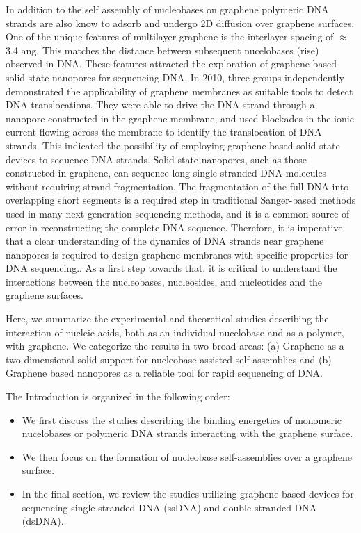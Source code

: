 In addition to the self assembly of nucleobases on graphene polymeric DNA strands are also know to adsorb and undergo 2D diffusion over graphene surfaces.\supercite{hampitak_protein_2020,wei_control_2019,he_planar_2020,shankla_step-defect_2019,shankla_conformational_2014,wells_assessing_2012} One of the unique features of multilayer graphene is the interlayer spacing of $\approx$ 3.4 ang. This matches the distance between subsequent nucelobases (rise) observed in DNA. These features attracted the exploration of graphene based solid state nanopores for sequencing DNA. In 2010, three groups independently demonstrated the applicability of graphene membranes as suitable tools to detect DNA translocations.\supercite{merchant_dna_2010,schneider_dna_2010,garaj_graphene_2010} They were able to drive the DNA strand through a nanopore constructed in the graphene membrane, and used blockades in the ionic current flowing across the membrane to identify the translocation of DNA strands. This indicated the possibility of employing graphene-based solid-state devices to sequence DNA strands. Solid-state nanopores, such as those constructed in graphene, can sequence long single-stranded DNA molecules without requiring strand fragmentation.\supercite{merchant_dna_2010,schneider_dna_2010,garaj_graphene_2010,li_dna_2003,yuan_solid-state_2018,xue_solid-state_2020} The fragmentation of the full DNA into overlapping short segments is a required step in traditional Sanger-based methods used in many next-generation sequencing methods, and it is a common source of error in reconstructing the complete DNA sequence.\supercite{sanger_dna_1977,daniels_sanger_2021,curci_how_2015} Therefore, it is imperative that a clear understanding of the dynamics of DNA strands near graphene nanopores is required to design graphene membranes with specific properties for DNA sequencing.\supercite{schneider_tailoring_2013}. As a first step towards that, it is critical to understand the interactions between the nucleobases, nucleosides, and nucleotides and the graphene surfaces.

Here, we summarize the experimental and theoretical studies describing the interaction of nucleic acids, both as an individual nucelobase and as a polymer, with graphene. We categorize the results in two broad areas: (a) Graphene as a two-dimensional solid support for nucleobase-assisted self-assemblies and (b) Graphene based nanopores as a reliable tool for rapid sequencing of DNA. 

The Introduction is organized in the following order:
\begin{itemize}
    \item We first discuss the studies describing the binding energetics of monomeric nucelobases or polymeric DNA strands interacting with the graphene surface.
    \item We then focus on the formation of nucleobase self-assemblies over a graphene surface.
    \item In the final section, we review the studies utilizing graphene-based devices for sequencing single-stranded DNA (ssDNA) and double-stranded DNA (dsDNA).
\end{itemize} 

